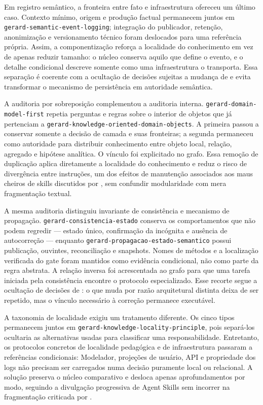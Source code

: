 \documentclass[preprint,12pt,authoryear]{elsarticle}
\begin{document}
Em registro semântico, a fronteira entre fato e infraestrutura ofereceu um último caso. Contexto mínimo, origem e produção factual permanecem juntos em \texttt{gerard-semantic-event-logging}; integração do publicador, retenção, anonimização e versionamento técnico foram deslocados para uma referência própria. Assim, a componentização reforça a localidade do conhecimento em vez de apenas reduzir tamanho: o núcleo conserva aquilo que define o evento, e o detalhe condicional descreve somente como uma infraestrutura o transporta. Essa separação é coerente com a ocultação de decisões sujeitas a mudança de \citet{parnas1972criteria} e evita transformar o mecanismo de persistência em autoridade semântica.

A auditoria por sobreposição complementou a auditoria interna. \texttt{gerard-domain-model-first} repetia perguntas e regras sobre o interior de objetos que já pertenciam a \texttt{gerard-knowledge-oriented-domain-objects}. A primeira passou a conservar somente a decisão de camada e suas fronteiras; a segunda permaneceu como autoridade para distribuir conhecimento entre objeto local, relação, agregado e hipótese analítica. O vínculo foi explicitado no grafo. Essa remoção de duplicação aplica diretamente a localidade do conhecimento e reduz o risco de divergência entre instruções, um dos efeitos de manutenção associados aos maus cheiros de skills discutidos por \citet{hong2026smells}, sem confundir modularidade com mera fragmentação textual.

A mesma auditoria distinguiu invariante de consistência e mecanismo de propagação. \texttt{gerard-consistencia-estado} conserva os comportamentos que não podem regredir --- estado único, confirmação da incógnita e ausência de autocorreção --- enquanto \texttt{gerard-propagacao-estado-semantico} possui publicação, ouvintes, reconciliação e snapshots. Nomes de métodos e a localização verificada do gate foram mantidos como evidência condicional, não como parte da regra abstrata. A relação inversa foi acrescentada ao grafo para que uma tarefa iniciada pela consistência encontre o protocolo especializado. Esse recorte segue a ocultação de decisões de \citet{parnas1972criteria}: o que muda por razão arquitetural distinta deixa de ser repetido, mas o vínculo necessário à correção permanece executável.

A taxonomia de localidade exigiu um tratamento diferente. Os cinco tipos permanecem juntos em \texttt{gerard-knowledge-locality-principle}, pois separá-los ocultaria as alternativas usadas para classificar uma responsabilidade. Entretanto, os protocolos concretos de localidade pedagógica e de infraestrutura passaram a referências condicionais: Modelador, projeções de usuário, API e propriedade dos logs não precisam ser carregados numa decisão puramente local ou relacional. A solução preserva o núcleo comparativo e desloca apenas aprofundamentos por modo, seguindo a divulgação progressiva de Agent Skills \citep{agentskills2026spec} sem incorrer na fragmentação criticada por \citet{hong2026smells}.
\end{document}
